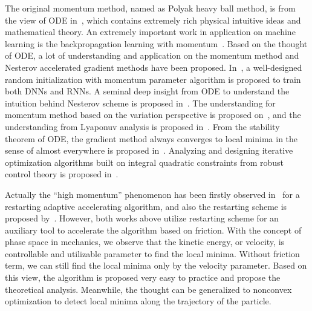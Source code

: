 \documentclass[11pt,fceqn]{article}
\numberwithin{equation}{section}
\theoremstyle{definition}
\begin{document}
The original momentum method, named as Polyak heavy ball method, is from the view of ODE in~\citep{polyak1964some}, which contains extremely rich physical intuitive ideas and mathematical theory. An extremely important work in application on machine learning is the backpropagation learning with momentum~\citep{rumelhart1988learning}. Based on the thought of ODE, a lot of understanding and application on the momentum method and Nesterov accelerated gradient methods have been proposed. In~\citep{sutskever2013importance}, a well-designed random initialization with momentum parameter algorithm is proposed to train both DNNs and RNNs. A seminal deep insight from ODE to understand the intuition behind Nesterov scheme is proposed in~\citep{su2014differential}. The understanding for momentum method based on the variation perspective is proposed on~\citep{wibisono2016variational}, and the understanding from Lyaponuv analysis is proposed in~\citep{wilson2016lyapunov}.  From the stability theorem of ODE, the gradient method always converges to local minima in the sense of almost everywhere is proposed in~\citep{lee2016gradient}.  Analyzing and designing iterative optimization algorithms built on integral quadratic constraints from robust control theory is proposed in~\citep{lessard2016analysis}. 

Actually the ``high momentum'' phenomenon has been firstly observed in~\citep{o2015adaptive} for a restarting adaptive accelerating algorithm, and also the restarting scheme is proposed by~\citep{su2014differential}. However, both works above utilize restarting scheme for an auxiliary tool to accelerate the algorithm based on friction. With the concept of phase space in mechanics, we observe that the kinetic energy, or velocity, is controllable and utilizable parameter to find the local minima. Without friction term, we can still find the local minima only by the velocity parameter.  Based on this view, the algorithm is proposed very easy to practice and propose the theoretical analysis. Meanwhile, the thought can be generalized to nonconvex optimization to detect local minima along the trajectory of the particle. 
\end{document}
